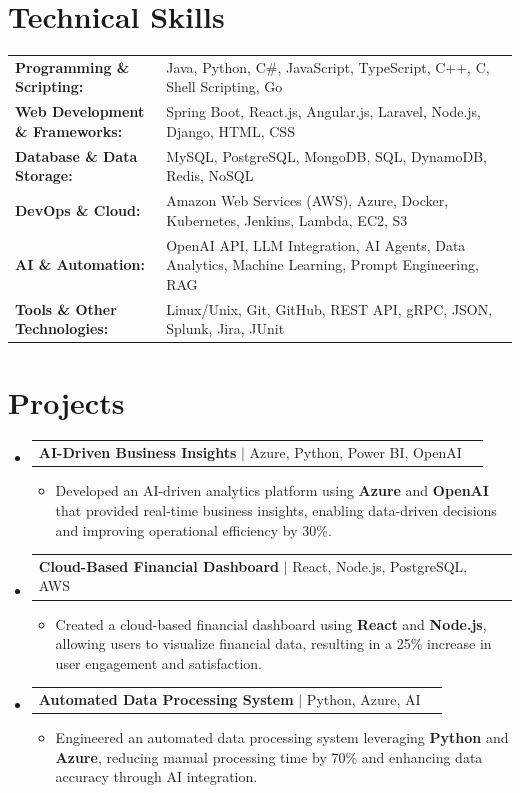 \documentclass[letterpaper,10pt]{article}
\makeatletter
\newcommand{\resumeItem}[1]{
  \item{\fontsize{8pt}{9pt}\selectfont
    #1 \vspace{-3pt}
  }
}
\newcommand{\resumeProjectHeading}[2]{
    \item
    \begin{tabular*}{1.001\textwidth}{l@{\extracolsep{\fill}}r}
      \fontsize{8.5pt}{10pt}#1 & \textbf{\fontsize{8.5pt}{10pt} #2}\\
    \end{tabular*}\vspace{-7pt}
}
\newcommand{\resumeSubHeadingListStart}{\begin{itemize}[leftmargin=0pt, label={}]}
\newcommand{\resumeSubHeadingListEnd}{\end{itemize}}
\newcommand{\resumeItemListStart}{\begin{itemize}[leftmargin=*]}
\newcommand{\resumeItemListEnd}{\end{itemize}\vspace{-5pt}}
\makeatother
\begin{document}
\section{Technical Skills}
        \vspace{-14pt}
        \begin{table}[h]
            \fontsize{8pt}{9pt}\selectfont
            \begin{tabular}{p{0.3\linewidth} p{0.7\linewidth}}
                \textbf{Programming \& Scripting:} & Java, Python, C\#, JavaScript, TypeScript, C++, C, Shell Scripting, Go \\
                \textbf{Web Development \& Frameworks:} & Spring Boot, React.js, Angular.js, Laravel, Node.js, Django, HTML, CSS \\
                \textbf{Database \& Data Storage:} & MySQL, PostgreSQL, MongoDB, SQL, DynamoDB, Redis, NoSQL \\
                \textbf{DevOps \& Cloud:} & Amazon Web Services (AWS), Azure, Docker, Kubernetes, Jenkins, Lambda, EC2, S3 \\
                \textbf{AI \& Automation:} & OpenAI API, LLM Integration, AI Agents, Data Analytics, Machine Learning, Prompt Engineering, RAG \\
                \textbf{Tools \& Other Technologies:} & Linux/Unix, Git, GitHub, REST API, gRPC, JSON, Splunk, Jira, JUnit \\
            \end{tabular}
        \end{table}
 \vspace{-18pt}

\section{Projects}
    \vspace{-5pt}
    \resumeSubHeadingListStart
          \resumeProjectHeading
            {\textbf{AI-Driven Business Insights} $|$ Azure, Python, Power BI, OpenAI}{}
            \resumeItemListStart
                \resumeItem{Developed an AI-driven analytics platform using \textbf{Azure} and \textbf{OpenAI} that provided real-time business insights, enabling data-driven decisions and improving operational efficiency by 30\%.}
            \resumeItemListEnd
        \vspace{-12pt}
    
        \resumeProjectHeading
            {\textbf{Cloud-Based Financial Dashboard} $|$ React, Node.js, PostgreSQL, AWS}{}
        \resumeItemListStart
                \resumeItem{Created a cloud-based financial dashboard using \textbf{React} and \textbf{Node.js}, allowing users to visualize financial data, resulting in a 25\% increase in user engagement and satisfaction.}
        \resumeItemListEnd
      \vspace{-12pt}
      \resumeProjectHeading
        {\textbf{Automated Data Processing System} $|$ Python, Azure, AI}{}
    \resumeItemListStart
            \resumeItem{Engineered an automated data processing system leveraging \textbf{Python} and \textbf{Azure}, reducing manual processing time by 70\% and enhancing data accuracy through AI integration.}
    \resumeItemListEnd
    \resumeSubHeadingListEnd
\end{document}
